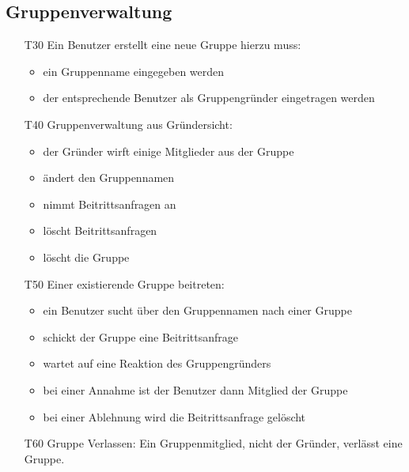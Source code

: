 \documentclass{scrartcl}
\begin{document}
	\subsection{Gruppenverwaltung}
	\begin{itemize}[nosep] 
		\item[T30] Ein Benutzer erstellt eine neue Gruppe hierzu muss:
			\begin{itemize}
			\item ein Gruppenname eingegeben werden
			\item der entsprechende Benutzer als Gruppengründer eingetragen werden
			\end{itemize}
		\item[T40] Gruppenverwaltung aus Gründersicht:
			\begin{itemize}
			\item der Gründer wirft einige Mitglieder aus der Gruppe
			\item ändert den Gruppennamen
			\item nimmt Beitrittsanfragen an
			\item löscht Beitrittsanfragen
			\item löscht die Gruppe
			\end{itemize}
		\item[T50] Einer existierende Gruppe beitreten:
	 		\begin{itemize}
			\item ein Benutzer sucht über den Gruppennamen nach einer Gruppe 
			\item schickt der Gruppe eine Beitrittsanfrage
			\item wartet auf eine Reaktion des Gruppengründers
			\item bei einer Annahme ist der Benutzer dann Mitglied der Gruppe
			\item bei einer Ablehnung wird die Beitrittsanfrage gelöscht 
			\end{itemize}
		\item[T60] Gruppe Verlassen: Ein Gruppenmitglied, nicht der Gründer, verlässt eine Gruppe.
	\end{itemize}	
\end{document}
